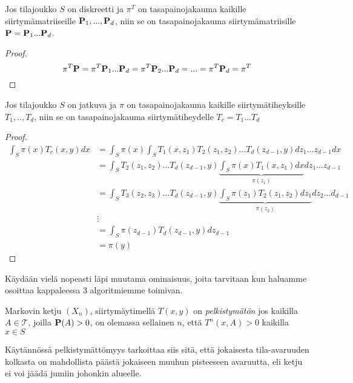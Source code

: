 \begin{lause}\label{cyclic-kernel}
	Jos tilajoukko $S$ on diskreetti ja $\pi^T$ on tasapainojakauma kaikille siirtymämatriiseille $\textbf{P}_1,...,\textbf{P}_d$, niin se on tasapainojakauma siirtymämatriisille $\textbf{P} = \textbf{P}_1...\textbf{P}_d$.
\end{lause}
\begin{proof}
	\begin{equation*}
		\pi^T \textbf{P} = \pi^T \textbf{P}_1...\textbf{P}_d = \pi^T \textbf{P}_2...\textbf{P}_d = ... = \pi^T \textbf{P}_d = \pi^T
	\end{equation*}
\end{proof}

\begin{lause}\label{cyclic-kernel-jatkuva}
	Jos tilajoukko $S$ on jatkuva ja $\pi$ on tasapainojakauma kaikille siirtymätiheyksille $T_1,..,T_d$, niin se on tasapainojakauma siirtymätiheydelle $T_c=T_1...T_d$
\end{lause}

\begin{proof}
	\begin{equation}
		\begin{split}
			\int_S \pi(x) T_c(x,y)dx &= \int_S \pi(x) \int_ST_1(x,z_1)T_2(z_1,z_2)...T_d(z_{d-1},y)dz_1...z_{d-1}dx \\
			&= \int_S T_2(z_1,z_2)...T_d(z_{d-1},y) \underbrace{\int_S \pi(x) T_1(x,z_1)dx}_{\pi(z_1)} dz_1...z_{d-1}\\
			&= \int_S T_3(z_2,z_3)...T_d(z_{d-1},y) \underbrace{\int_S \pi(z_1)T_2(z_1,z_2)dz_1}_{\pi(z_2)} dz_2...d_{d-1} \\
			& \vdots \\
			&= \int_S \pi(z_{d-1})T_d(z_{d-1},y)dz_{d-1} \\
			&= \pi(y)
		\end{split}
	\end{equation}
\end{proof}


Käydään vielä nopeasti läpi muutama ominaisuus, joita tarvitaan kun haluamme osoittaa kappaleessa 3 algoritmiemme toimivan. \cite{monte_carlo_book, koistinen_computational_2009}

\begin{maar}
	Markovin ketju $(X_n)$, siirtymäytimellä $T(x,y)$ on \textit{pelkistymätön} jos kaikilla $A \in \mathcal{T}$, joilla $\textbf{P}(A)>0$, on olemassa sellainen $n$, että $T^n(x, A)>0$ kaikilla $x\in S$
\end{maar} 

Käytännössä pelkistymättömyys tarkoittaa siis sitä, että jokaisesta tila-avaruuden kolkasta on mahdollista päästä jokaiseen muuhun pisteeseen avaruutta, eli ketju ei voi jäädä jumiin johonkin alueelle.


